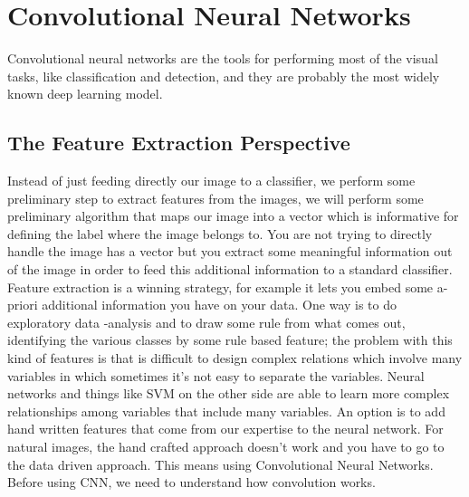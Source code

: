 \section{Convolutional Neural Networks}
Convolutional neural networks are the tools for performing most of the visual tasks, like classification and detection, and they are probably the most widely known deep learning model. 

\subsection{The Feature Extraction Perspective}
Instead of just feeding directly our image to a classifier, we perform some preliminary step to extract features from the images, we will perform some preliminary algorithm that maps our image into a vector which is informative for defining the label where the image belongs to. You are not trying to directly handle the image has a vector but you extract some meaningful information out of the image in order to feed this additional information to a standard classifier. Feature extraction is a winning strategy, for example it lets you embed some a-priori additional information you have on your data. One way is to do exploratory data -analysis and to draw some rule from what comes out, identifying the various classes by some rule based feature; the problem with this kind of features is that is difficult to design complex relations which involve many variables in which sometimes it's not easy to separate the variables. Neural networks and things like SVM on the other side are able to learn more complex relationships among variables that include many variables. An option is to add hand written features that come from our expertise to the neural network. For natural images, the hand crafted approach doesn't work and you have to go to the data driven approach. This means using Convolutional Neural Networks. Before using CNN, we need to understand how convolution works.

